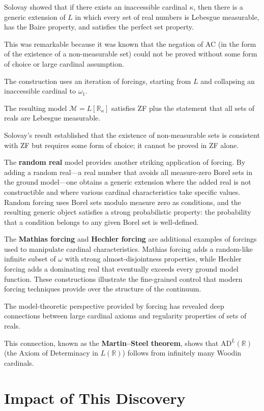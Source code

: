 Solovay showed that if there exists an inaccessible cardinal $\kappa$, then there is a generic extension of $L$ in which every set of real numbers is Lebesgue measurable, has the Baire property, and satisfies the perfect set property.

This was remarkable because it was known that the negation of AC (in the form of the existence of a non-measurable set) could not be proved without some form of choice or large cardinal assumption.

The construction uses an iteration of forcings, starting from $L$ and collapsing an inaccessible cardinal to $\omega_1$.

The resulting model $\mathcal{M} = L[\mathbb{R}_\kappa]$ satisfies ZF plus the statement that all sets of reals are Lebesgue measurable.

Solovay's result established that the existence of non-measurable sets is consistent with ZF but requires some form of choice; it cannot be proved in ZF alone.

The \textbf{random real} model provides another striking application of forcing. By adding a random real---a real number that avoids all measure-zero Borel sets in the ground model---one obtains a generic extension where the added real is not constructible and where various cardinal characteristics take specific values. Random forcing uses Borel sets modulo measure zero as conditions, and the resulting generic object satisfies a strong probabilistic property: the probability that a condition belongs to any given Borel set is well-defined.

The \textbf{Mathias forcing} and \textbf{Hechler forcing} are additional examples of forcings used to manipulate cardinal characteristics. Mathias forcing adds a random-like infinite subset of $\omega$ with strong almost-disjointness properties, while Hechler forcing adds a dominating real that eventually exceeds every ground model function. These constructions illustrate the fine-grained control that modern forcing techniques provide over the structure of the continuum.

The model-theoretic perspective provided by forcing has revealed deep connections between large cardinal axioms and regularity properties of sets of reals.

This connection, known as the \textbf{Martin--Steel theorem}, shows that $\text{AD}^L(\mathbb{R})$ (the Axiom of Determinacy in $L(\mathbb{R})$) follows from infinitely many Woodin cardinals.

\section{Impact of This Discovery}

